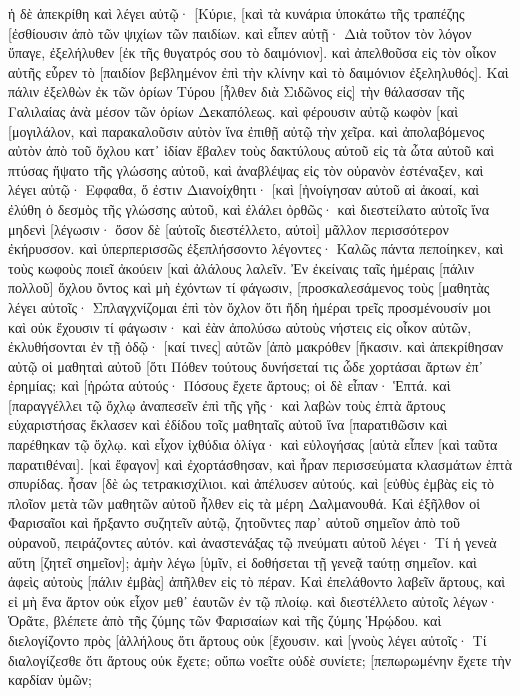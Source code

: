 ἡ δὲ ἀπεκρίθη καὶ λέγει αὐτῷ· [Κύριε, [καὶ τὰ κυνάρια ὑποκάτω τῆς τραπέζης [ἐσθίουσιν ἀπὸ τῶν ψιχίων τῶν παιδίων. 
καὶ εἶπεν αὐτῇ· Διὰ τοῦτον τὸν λόγον ὕπαγε, ἐξελήλυθεν [ἐκ τῆς θυγατρός σου τὸ δαιμόνιον]. 
καὶ ἀπελθοῦσα εἰς τὸν οἶκον αὐτῆς εὗρεν τὸ [παιδίον βεβλημένον ἐπὶ τὴν κλίνην καὶ τὸ δαιμόνιον ἐξεληλυθός]. 
Καὶ πάλιν ἐξελθὼν ἐκ τῶν ὁρίων Τύρου [ἦλθεν διὰ Σιδῶνος εἰς] τὴν θάλασσαν τῆς Γαλιλαίας ἀνὰ μέσον τῶν ὁρίων Δεκαπόλεως. 
καὶ φέρουσιν αὐτῷ κωφὸν [καὶ [μογιλάλον, καὶ παρακαλοῦσιν αὐτὸν ἵνα ἐπιθῇ αὐτῷ τὴν χεῖρα. 
καὶ ἀπολαβόμενος αὐτὸν ἀπὸ τοῦ ὄχλου κατ᾽ ἰδίαν ἔβαλεν τοὺς δακτύλους αὐτοῦ εἰς τὰ ὦτα αὐτοῦ καὶ πτύσας ἥψατο τῆς γλώσσης αὐτοῦ, 
καὶ ἀναβλέψας εἰς τὸν οὐρανὸν ἐστέναξεν, καὶ λέγει αὐτῷ· Εφφαθα, ὅ ἐστιν Διανοίχθητι· 
[καὶ [ἠνοίγησαν αὐτοῦ αἱ ἀκοαί, καὶ ἐλύθη ὁ δεσμὸς τῆς γλώσσης αὐτοῦ, καὶ ἐλάλει ὀρθῶς· 
καὶ διεστείλατο αὐτοῖς ἵνα μηδενὶ [λέγωσιν· ὅσον δὲ [αὐτοῖς διεστέλλετο, αὐτοὶ] μᾶλλον περισσότερον ἐκήρυσσον. 
καὶ ὑπερπερισσῶς ἐξεπλήσσοντο λέγοντες· Καλῶς πάντα πεποίηκεν, καὶ τοὺς κωφοὺς ποιεῖ ἀκούειν [καὶ ἀλάλους λαλεῖν. 
Ἐν ἐκείναις ταῖς ἡμέραις [πάλιν πολλοῦ] ὄχλου ὄντος καὶ μὴ ἐχόντων τί φάγωσιν, [προσκαλεσάμενος τοὺς [μαθητὰς λέγει αὐτοῖς· 
Σπλαγχνίζομαι ἐπὶ τὸν ὄχλον ὅτι ἤδη ἡμέραι τρεῖς προσμένουσίν μοι καὶ οὐκ ἔχουσιν τί φάγωσιν· 
καὶ ἐὰν ἀπολύσω αὐτοὺς νήστεις εἰς οἶκον αὐτῶν, ἐκλυθήσονται ἐν τῇ ὁδῷ· [καί τινες] αὐτῶν [ἀπὸ μακρόθεν [ἥκασιν. 
καὶ ἀπεκρίθησαν αὐτῷ οἱ μαθηταὶ αὐτοῦ [ὅτι Πόθεν τούτους δυνήσεταί τις ὧδε χορτάσαι ἄρτων ἐπ᾽ ἐρημίας; 
καὶ [ἠρώτα αὐτούς· Πόσους ἔχετε ἄρτους; οἱ δὲ εἶπαν· Ἑπτά. 
καὶ [παραγγέλλει τῷ ὄχλῳ ἀναπεσεῖν ἐπὶ τῆς γῆς· καὶ λαβὼν τοὺς ἑπτὰ ἄρτους εὐχαριστήσας ἔκλασεν καὶ ἐδίδου τοῖς μαθηταῖς αὐτοῦ ἵνα [παρατιθῶσιν καὶ παρέθηκαν τῷ ὄχλῳ. 
καὶ εἶχον ἰχθύδια ὀλίγα· καὶ εὐλογήσας [αὐτὰ εἶπεν [καὶ ταῦτα παρατιθέναι]. 
[καὶ ἔφαγον] καὶ ἐχορτάσθησαν, καὶ ἦραν περισσεύματα κλασμάτων ἑπτὰ σπυρίδας. 
ἦσαν [δὲ ὡς τετρακισχίλιοι. καὶ ἀπέλυσεν αὐτούς. 
καὶ [εὐθὺς ἐμβὰς εἰς τὸ πλοῖον μετὰ τῶν μαθητῶν αὐτοῦ ἦλθεν εἰς τὰ μέρη Δαλμανουθά. 
Καὶ ἐξῆλθον οἱ Φαρισαῖοι καὶ ἤρξαντο συζητεῖν αὐτῷ, ζητοῦντες παρ᾽ αὐτοῦ σημεῖον ἀπὸ τοῦ οὐρανοῦ, πειράζοντες αὐτόν. 
καὶ ἀναστενάξας τῷ πνεύματι αὐτοῦ λέγει· Τί ἡ γενεὰ αὕτη [ζητεῖ σημεῖον]; ἀμὴν λέγω [ὑμῖν, εἰ δοθήσεται τῇ γενεᾷ ταύτῃ σημεῖον. 
καὶ ἀφεὶς αὐτοὺς [πάλιν ἐμβὰς] ἀπῆλθεν εἰς τὸ πέραν. 
Καὶ ἐπελάθοντο λαβεῖν ἄρτους, καὶ εἰ μὴ ἕνα ἄρτον οὐκ εἶχον μεθ᾽ ἑαυτῶν ἐν τῷ πλοίῳ. 
καὶ διεστέλλετο αὐτοῖς λέγων· Ὁρᾶτε, βλέπετε ἀπὸ τῆς ζύμης τῶν Φαρισαίων καὶ τῆς ζύμης Ἡρῴδου. 
καὶ διελογίζοντο πρὸς [ἀλλήλους ὅτι ἄρτους οὐκ [ἔχουσιν. 
καὶ [γνοὺς λέγει αὐτοῖς· Τί διαλογίζεσθε ὅτι ἄρτους οὐκ ἔχετε; οὔπω νοεῖτε οὐδὲ συνίετε; [πεπωρωμένην ἔχετε τὴν καρδίαν ὑμῶν; 
